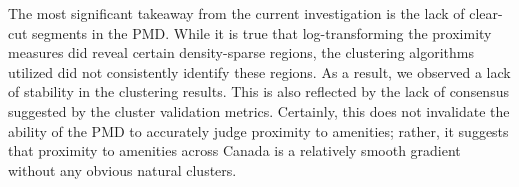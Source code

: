 \documentclass[11pt, a4paper]{article}
\begin{document}
\par
\hspace{1pc} The most significant takeaway from the current investigation is the lack of clear-cut segments in the PMD. While it is true that log-transforming the proximity measures did reveal certain density-sparse regions, the clustering algorithms utilized did not consistently identify these regions. As a result, we observed a lack of stability in the clustering results. This is also reflected by the lack of consensus suggested by the cluster validation metrics. Certainly, this does not invalidate the ability of the PMD to accurately judge proximity to amenities; rather, it suggests that proximity to amenities across Canada is a relatively smooth gradient without any obvious natural clusters.













\pagebreak
\end{document}
